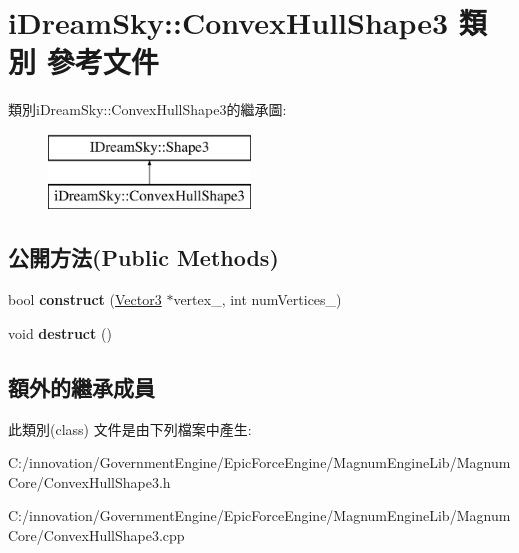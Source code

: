 \hypertarget{classi_dream_sky_1_1_convex_hull_shape3}{}\section{i\+Dream\+Sky\+:\+:Convex\+Hull\+Shape3 類別 參考文件}
\label{classi_dream_sky_1_1_convex_hull_shape3}
類別i\+Dream\+Sky\+:\+:Convex\+Hull\+Shape3的繼承圖\+:\begin{figure}[H]
\begin{center}
\leavevmode
\includegraphics[height=2.000000cm]{classi_dream_sky_1_1_convex_hull_shape3}
\end{center}
\end{figure}
\subsection*{公開方法(Public Methods)}
\begin{DoxyCompactItemize}
\item 
bool {\bfseries construct} (\hyperlink{class_i_dream_sky_1_1_vector3}{Vector3} $\ast$vertex\+\_\+, int num\+Vertices\+\_\+)\hypertarget{classi_dream_sky_1_1_convex_hull_shape3_aaecc70e571d683c3f08fffe43a99a873}{}\label{classi_dream_sky_1_1_convex_hull_shape3_aaecc70e571d683c3f08fffe43a99a873}

\item 
void {\bfseries destruct} ()\hypertarget{classi_dream_sky_1_1_convex_hull_shape3_afb7c859a2b04dbf78835855f86dcf59a}{}\label{classi_dream_sky_1_1_convex_hull_shape3_afb7c859a2b04dbf78835855f86dcf59a}

\end{DoxyCompactItemize}
\subsection*{額外的繼承成員}


此類別(class) 文件是由下列檔案中產生\+:\begin{DoxyCompactItemize}
\item 
C\+:/innovation/\+Government\+Engine/\+Epic\+Force\+Engine/\+Magnum\+Engine\+Lib/\+Magnum\+Core/Convex\+Hull\+Shape3.\+h\item 
C\+:/innovation/\+Government\+Engine/\+Epic\+Force\+Engine/\+Magnum\+Engine\+Lib/\+Magnum\+Core/Convex\+Hull\+Shape3.\+cpp\end{DoxyCompactItemize}

